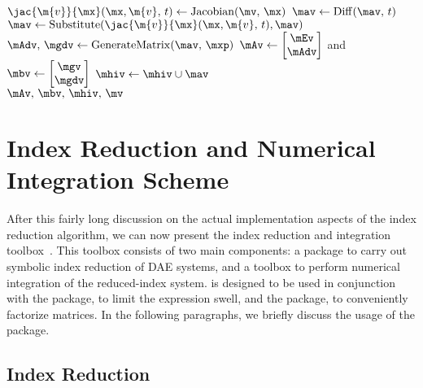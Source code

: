 \begin{breakablealgorithm}
\begin{algorithmic}[1]
        \State $\jac{\m{v}}{\mx}(\mx, \m{v}, \, t) \gets \mathrm{Jacobian}(\mv, \, \mx)$ 
        \State $\mav \gets \mathrm{Diff}(\mav, \, t)$ 
        \State $\mav \gets \mathrm{Substitute}(\jac{\m{v}}{\mx}(\mx, \m{v}, \, t), \mav)$ 
        \State $\mAdv, \, \mgdv \gets \mathrm{GenerateMatrix}(\mav, \, \mxp)$ 
        \State $\mAv \gets \begin{bmatrix} \mEv \\ \mAdv \end{bmatrix}$ and $\mbv \gets \begin{bmatrix} \mgv \\ \mgdv \end{bmatrix}$
        \State $\mhiv \gets \mhiv \cup \mav$ 
      \EndWhile \\
      \Return $\mAv, \, \mbv, \, \mhiv, \, \mv$ 
    \EndProcedure
  \end{algorithmic}
\end{breakablealgorithm}


\section{Index Reduction and Numerical Integration Scheme}
\label{chap4:sec:indigo}

After this fairly long discussion on the actual implementation aspects of the index reduction algorithm, we can now present the \Indigo{} index reduction and integration toolbox~\cite{indigo}. This toolbox consists of two main components: a \Maple{} package to carry out symbolic index reduction of \ac{DAE} systems, and a \Matlab{} toolbox to perform numerical integration of the reduced-index system. \Indigo{} is designed to be used in conjunction with the \LEM{} package, to limit the expression swell, and the \LAST{} package, to conveniently factorize matrices. In the following paragraphs, we briefly discuss the usage of the \Indigo{} package.

\subsection{Index Reduction}

